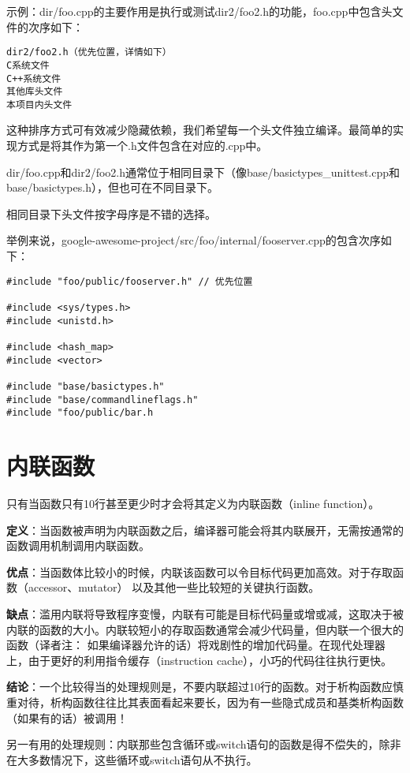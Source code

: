 示例：dir/foo.cpp的主要作用是执行或测试dir2/foo2.h的功能，foo.cpp中包含头文件的次序如下：
\begin{verbatim}
dir2/foo2.h（优先位置，详情如下）
C系统文件
C++系统文件
其他库头文件
本项目内头文件
\end{verbatim}

这种排序方式可有效减少隐藏依赖，我们希望每一个头文件独立编译。最简单的实现方式是将其作为第一个.h文件包含在对应的.cpp中。

dir/foo.cpp和dir2/foo2.h通常位于相同目录下（像base/basictypes\_unittest.cpp和base/basictypes.h），但也可在不同目录下。

相同目录下头文件按字母序是不错的选择。

举例来说，google-awesome-project/src/foo/internal/fooserver.cpp的包含次序如下：
\begin{verbatim}
#include "foo/public/fooserver.h" // 优先位置

#include <sys/types.h>
#include <unistd.h>

#include <hash_map>
#include <vector>

#include "base/basictypes.h"
#include "base/commandlineflags.h"
#include "foo/public/bar.h
\end{verbatim}


\section{内联函数}
只有当函数只有10行甚至更少时才会将其定义为内联函数（inline function）。

\textbf{定义}：当函数被声明为内联函数之后，编译器可能会将其内联展开，无需按通常的函数调用机制调用内联函数。

\textbf{优点}：当函数体比较小的时候，内联该函数可以令目标代码更加高效。对于存取函数（accessor、mutator） 以及其他一些比较短的关键执行函数。

\textbf{缺点}：滥用内联将导致程序变慢，内联有可能是目标代码量或增或减，这取决于被内联的函数的大小。内联较短小的存取函数通常会减少代码量，但内联一个很大的函数（译者注： 如果编译器允许的话）将戏剧性的增加代码量。在现代处理器上，由于更好的利用指令缓存（instruction cache），小巧的代码往往执行更快。

\textbf{结论}：一个比较得当的处理规则是，不要内联超过10行的函数。对于析构函数应慎重对待，析构函数往往比其表面看起来要长，因为有一些隐式成员和基类析构函数（如果有的话）被调用！

另一有用的处理规则：内联那些包含循环或switch语句的函数是得不偿失的，除非在大多数情况下，这些循环或switch语句从不执行。

